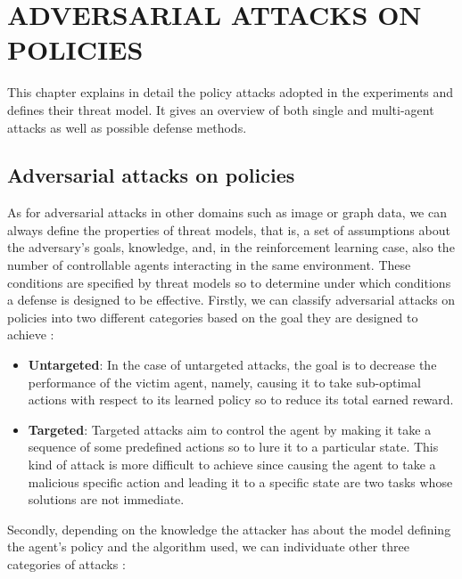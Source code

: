 
\chapter{ADVERSARIAL ATTACKS ON POLICIES}
\label{sec:rla}

This chapter explains in detail the policy attacks adopted in the experiments and defines their threat model. It gives an overview of both single and multi-agent attacks as well as possible defense methods.

\section{Adversarial attacks on policies}
As for adversarial attacks in other domains such as image or graph data, we can always define the properties of threat models, that is, a set of assumptions about the adversary’s goals, knowledge, and, in the reinforcement learning case, also the number of controllable agents interacting in the same environment. These conditions are specified by threat models so to determine under which conditions a defense is designed to be effective. Firstly, we can classify adversarial attacks on policies into two different categories based on the goal they are designed to achieve \cite{lin2017tactics}:
\begin{itemize}
    \item \textbf{Untargeted}: In the case of untargeted attacks, the goal is to decrease the performance of the victim agent, namely, causing it to take sub-optimal actions with respect to its learned policy so to reduce its total earned reward.
    \item \textbf{Targeted}: Targeted attacks aim to control the agent by making it take a sequence of some predefined actions so to lure it to a particular state. This kind of attack is more difficult to achieve since causing the agent to take a malicious specific action and leading it to a specific state are two tasks whose solutions are not immediate.
\end{itemize}
Secondly, depending on the knowledge the attacker has about the model defining the agent's policy and the algorithm used, we can individuate other three categories of attacks \cite{s2017adversarial}:

